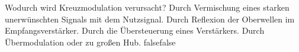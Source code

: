     {Wodurch wird Kreuzmodulation verursacht?}
    {Durch Vermischung eines starken unerwünschten Signals mit dem Nutzsignal.}
    {Durch Reflexion der Oberwellen im Empfangsverstärker.}
    {Durch die Übersteuerung eines Verstärkers.}
    {Durch Übermodulation oder zu großen Hub.}
    {false}{false}